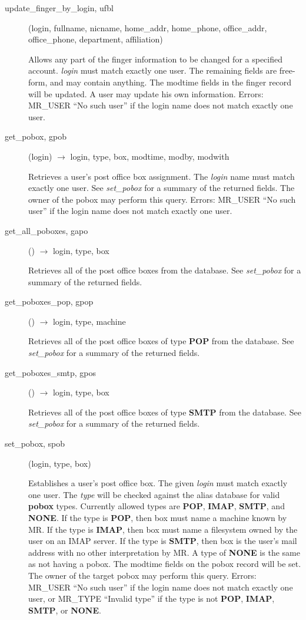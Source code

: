 \documentclass{article}
\begin{document}
\begin{description}
\item[update\_finger\_by\_login, ufbl](login, fullname, nicname, home\_addr,
home\_phone, office\_addr, office\_phone, department, affiliation)

Allows any part of the finger information to be changed for a
specified account.  {\em login} must match exactly one user.  The
remaining fields are free-form, and may contain anything.  The modtime
fields in the finger record will be updated.  A user may update his
own information.  Errors: MR\_USER ``No such user'' if the login name
does not match exactly one user.

\item[get\_pobox, gpob](login) $\rightarrow$ login, type, box, modtime,
modby, modwith

Retrieves a user's post office box assignment. The {\em login} name
must match exactly one user. See {\em set\_pobox} for a summary of the
returned fields. The owner of the pobox may perform this query.
Errors: MR\_USER ``No such user'' if the login name does not match
exactly one user.

\item[get\_all\_poboxes, gapo]() $\rightarrow$ login, type, box

Retrieves all of the post office boxes from the database.  See
{\em set\_pobox} for a summary of the returned fields.

\item[get\_poboxes\_pop, gpop]() $\rightarrow$ login, type, machine

Retrieves all of the post office boxes of type {\bf POP} from the
database.  See {\em set\_pobox} for a summary of the returned fields.

\item[get\_poboxes\_smtp, gpos]() $\rightarrow$ login, type, box

Retrieves all of the post office boxes of type {\bf SMTP} from the
database.  See {\em set\_pobox} for a summary of the returned fields.

\item[set\_pobox, spob](login, type, box)

Establishes a user's post office box.  The given {\em login} must match
exactly one user.  The {\em type} will be checked against the alias
database for valid {\bf pobox} types.  Currently allowed types are {\bf
POP}, {\bf IMAP}, {\bf SMTP}, and {\bf NONE}.  If the type is {\bf POP},
then box must name a machine known by MR.  If the type is {\bf IMAP},
then box must name a filesystem owned by the user on an IMAP server. If
the type is {\bf SMTP}, then box is the user's mail address with no
other interpretation by MR.  A type of {\bf NONE} is the same as not
having a pobox.  The modtime fields on the pobox record will be set.
The owner of the target pobox may perform this query.  Errors: MR\_USER
``No such user'' if the login name does not match exactly one user, or
MR\_TYPE ``Invalid type'' if the type is not {\bf POP}, {\bf IMAP}, {\bf
SMTP}, or {\bf NONE}.


\end{description}
\end{document}
